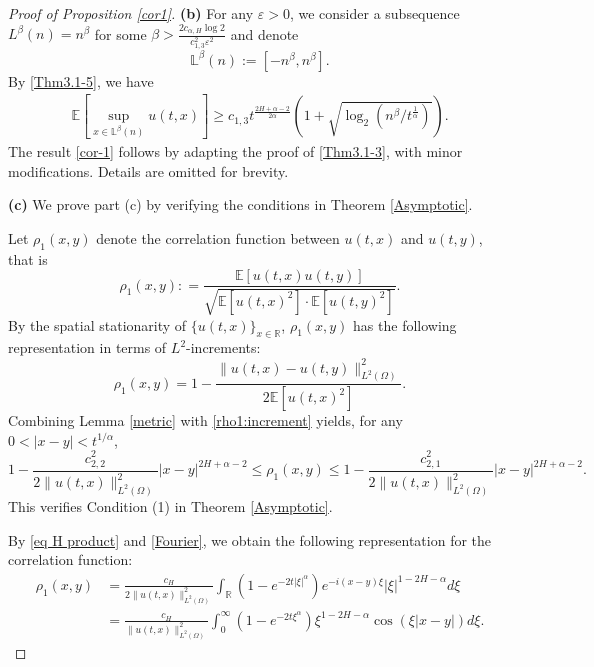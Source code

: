 \documentclass[11pt,reqno]{amsart}
\numberwithin{equation}{section}
\def\EE{\mathbb{E}}
\def\bL{\mathbb{L}}
\newcommand{\1}{{\bf 1}}
\newcommand{\2}{{\bf 2}}
\newcommand{\lc}{\left(}
\newcommand{\rc}{\right)}
\newcommand{\lk}{\left[}
\newcommand{\rk}{\right]}
\begin{document}
\begin{proof}[Proof of Proposition \ref{cor1}]
\noindent\textbf{(b)}
 For any $\varepsilon>0$, we consider a subsequence $L^{\beta}(n)=n^\beta$ for some $\beta>\frac{2c_{\alpha,H}\log 2}{c_{1,3}^2\varepsilon^2}$ and denote $$\bL^\beta(n):=\left[-n^\beta,n^\beta\right].$$
 By
 \eqref {Thm3.1-5}, we have
\begin{align*}
\EE \lk\sup_{x\in\bL^\beta(n)} u(t,x)\rk
     \geq c_{1,3}t^{\frac{2H+\alpha-2}{2\alpha}}
     \lc 1+\sqrt{\log_2{\lc n^\beta/t^{\frac{1}{\alpha}}\rc}}\rc.
\end{align*}
The result \eqref{cor-1} follows by adapting the proof of \eqref{Thm3.1-3}, with minor modifications. Details are omitted for brevity.

 \noindent\textbf{(c)}  We prove  part (c) by verifying the conditions in Theorem \ref{Asymptotic}. 
 
 Let $\rho_1(x,y)$ denote the correlation function between $u(t,x)$ and $u(t,y)$, that is
\[
\rho_1(x,y): = \frac{\mathbb{E}[u(t,x) u(t,y)]}{\sqrt{\mathbb{E}[u(t,x)^2] \cdot \mathbb{E}[u(t,y)^2]}}.
\]
By the spatial stationarity of $\{u(t, x)\}_{x \in \mathbb{R}}$, $\rho_1(x,y)$ has the following representation in terms of $L^2$-increments:
\begin{equation}\label{rho1:increment}
\rho_1(x,y) = 1 - \frac{\|u(t,x) - u(t,y)\|_{L^2(\Omega)}^2}{2\mathbb{E}[u(t,x)^2]}.
\end{equation}
Combining Lemma \ref{metric} with \eqref{rho1:increment} yields,    for any $0 < |x - y| < t^{1/\alpha}$,
\begin{equation}\label{rho1:bounds}
1 - \frac{c_{2,2}^2}{2\|u(t,x)\|_{L^2(\Omega)}^2} |x - y|^{2H + \alpha - 2}
\leq \rho_1(x,y) \leq
1 - \frac{c_{2,1}^2}{2\|u(t,x)\|_{L^2(\Omega)}^2} |x - y|^{2H + \alpha - 2}.
\end{equation}
This verifies Condition (1) in Theorem \ref{Asymptotic}.



By \eqref{eq H product} and \eqref{Fourier}, we obtain the following representation for the correlation function:
\begin{equation}\label{rho1:1}
\begin{split}
\rho_1(x,y)
&= \frac{c_{H}}{2\|u(t,x)\|_{L^2(\Omega)}^2}
\int_{\mathbb{R}}\left(1-e^{-2t|\xi|^\alpha}\right) e^{-i(x-y)\xi} |\xi|^{1-2H-\alpha} d\xi \\
&= \frac{c_{H}}{\|u(t,x)\|_{L^2(\Omega)}^2}
\int_0^\infty \left(1-e^{-2t\xi^\alpha}\right) \xi^{1-2H-\alpha} \cos\left(\xi|x-y|\right) d\xi.
\end{split}
\end{equation}


\end{proof}
\end{document}
